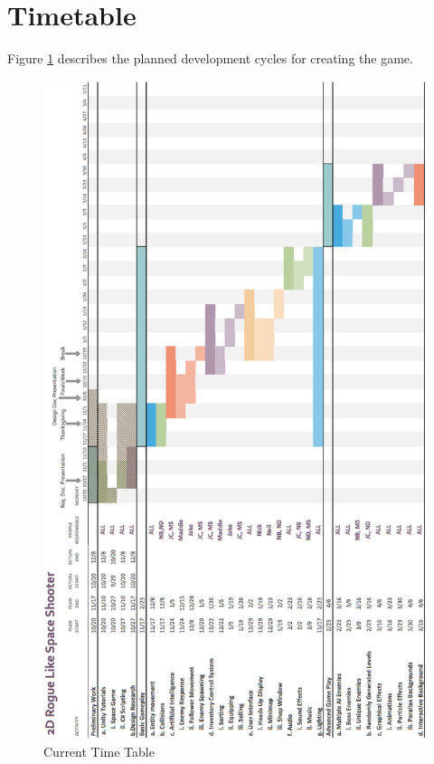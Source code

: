 \documentclass[12pt]{article}       %
\begin{document}
\section{Timetable}
\label{sec:time}
Figure \ref{Time} describes the planned development cycles for creating the game.

\begin{figure} [H]
\centering
\includegraphics[width=4.3 in]{TimeTableDec.png}
\caption{Current Time Table} \label{Time}
\end{figure}


\newpage
\end{document}
